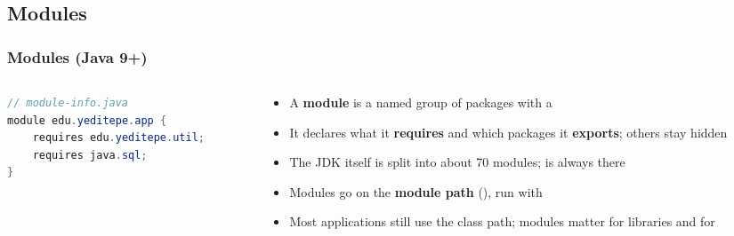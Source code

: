 \documentclass[aspectratio=169,10pt,compress]{beamer}
\begin{document}
\subsection[Modules]{Modules}




\begin{frame}[t,fragile] \frametitle{Modules (Java 9+)}
  \begin{columns}[T]
    \begin{column}{0.46\textwidth}


\begin{lstlisting}[style=codesnippet, language=Java]
// module-info.java
module edu.yeditepe.app {
    requires edu.yeditepe.util;
    requires java.sql;
}
\end{lstlisting}


      \begin{center}
      \end{center}
    \end{column}
    \begin{column}{0.5\textwidth}
      \begin{itemize}\small
        \item A \textbf{module} is a named group of packages with a 
        \item It declares what it \textbf{requires} and which packages it \textbf{exports}; others stay hidden
        \item The JDK itself is split into about 70 modules;  is always there
        \item Modules go on the \textbf{module path} (), run with 
        \item Most applications still use the class path; modules matter for libraries and for 
      \end{itemize}
    \end{column}
  \end{columns}
\end{frame}
\end{document}
